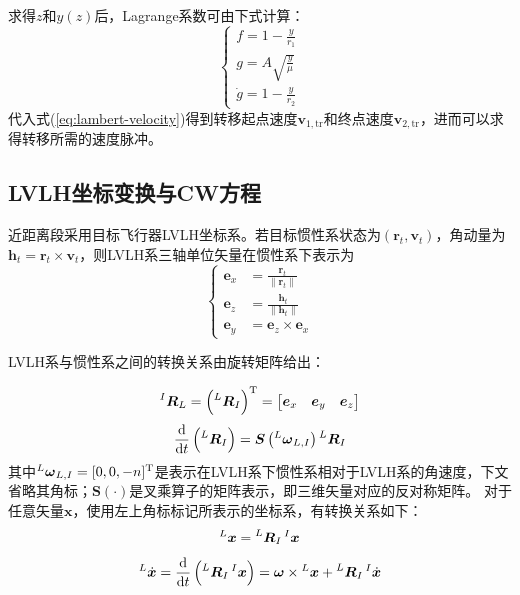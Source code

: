\documentclass[10.5pt,twocolumn]{aaas}
\begin{document}
求得$z$和$y(z)$后，Lagrange系数可由下式计算：
\begin{equation}\left\{
  \begin{aligned}
    f=1-\frac{y}{r_1}       \\
    g=A\sqrt{\frac{y}{\mu}} \\
    \dot g=1-\frac{y}{r_2}
  \end{aligned}
  \right.
\end{equation}
代入式(\ref{eq:lambert-velocity})得到转移起点速度$\boldsymbol{v}_{1,\mathrm{tr}}$和终点速度$\boldsymbol{v}_{2,\mathrm{tr}}$，进而可以求得转移所需的速度脉冲。

\subsection{LVLH坐标变换与CW方程}

近距离段采用目标飞行器LVLH坐标系。若目标惯性系状态为$(\boldsymbol{r}_t,\boldsymbol{v}_t)$，角动量为$\boldsymbol{h}_t = \boldsymbol{r}_t \times \boldsymbol{v}_t$，则LVLH系三轴单位矢量在惯性系下表示为
\begin{equation}\left\{
  \begin{aligned}
    \boldsymbol{e}_x & =\frac{\boldsymbol{r}_t}{\|\boldsymbol{r}_t\|} \\
    \boldsymbol{e}_z & =\frac{\boldsymbol{h}_t}{\|\boldsymbol{h}_t\|} \\
    \boldsymbol{e}_y & =\boldsymbol{e}_z \times \boldsymbol{e}_x
  \end{aligned}
  \right.
\end{equation}

LVLH系与惯性系之间的转换关系由旋转矩阵给出：

\begin{equation}
  \prescript{I}{}{\boldsymbol{R}}_{L} = \left(\prescript{L}{}{\boldsymbol{R}}_{I}\right)^\mathrm{T} =
  \begin{bmatrix}
    \boldsymbol{e}_x & \boldsymbol{e}_y & \boldsymbol{e}_z
  \end{bmatrix}
\end{equation}
\begin{equation}
  \frac{\mathrm{d}}{\mathrm{d}t}\left(\prescript{L}{}{\boldsymbol{R}}_{I}\right) =
  \boldsymbol{S}\left(\prescript{L}{}{\boldsymbol{\omega}}_{L,I}\right)
  \prescript{L}{}{\boldsymbol{R}}_{I}
\end{equation}
其中$\prescript{L}{}{\boldsymbol{\omega}}_{L,I}=[0,0,-n]^\mathrm{T}$是表示在LVLH系下惯性系相对于LVLH系的角速度，下文省略其角标；$\boldsymbol{S}(\cdot)$是叉乘算子的矩阵表示，即三维矢量对应的反对称矩阵。
对于任意矢量$\boldsymbol{x}$，使用左上角标标记所表示的坐标系，有转换关系如下：
\begin{equation}
  \prescript{L}{}{\boldsymbol{x}} = \prescript{L}{}{\boldsymbol{R}}_{I} \prescript{I}{}{\boldsymbol{x}}
\end{equation}
\begin{equation}
  \prescript{L}{}{\dot{\boldsymbol{x}}}
  = \frac{\mathrm{d}}{\mathrm{d}t}\left(\prescript{L}{}{\boldsymbol{R}}_{I} \prescript{I}{}{\boldsymbol{x}}\right)
  = \boldsymbol{\omega} \times \prescript{L}{}{\boldsymbol{x}} + \prescript{L}{}{\boldsymbol{R}}_{I} \prescript{I}{}{\dot{\boldsymbol{x}}}
\end{equation}
\end{document}
